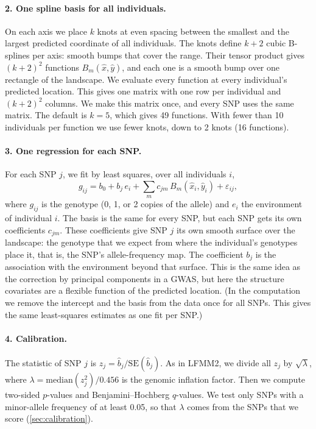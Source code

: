 \paragraph{2. One spline basis for all individuals.}
On each axis we place $k$ knots at even spacing between the smallest and
the largest predicted coordinate of all individuals. The knots define
$k+2$ cubic B-splines per axis: smooth bumps that cover the range. Their
tensor product gives $(k+2)^2$ functions $B_m(\hat{x}, \hat{y})$, and each
one is a smooth bump over one rectangle of the landscape. We evaluate
every function at every individual's predicted location. This gives one
matrix with one row per individual and $(k+2)^2$ columns. We make this
matrix once, and every SNP uses the same matrix. The default is $k = 5$,
which gives 49 functions. With fewer than 10 individuals per function we
use fewer knots, down to 2 knots (16 functions).

\paragraph{3. One regression for each SNP.}
For each SNP $j$, we fit by least squares, over all individuals $i$,
\begin{equation*}
g_{ij} = b_0 + b_j\, e_i + \sum_{m} c_{jm}\, B_m(\hat{x}_i, \hat{y}_i) + \varepsilon_{ij},
\end{equation*}
where $g_{ij}$ is the genotype (0, 1, or 2 copies of the allele) and $e_i$
the environment of individual $i$. The basis is the same for every SNP, but
each SNP gets its own coefficients $c_{jm}$. These coefficients give SNP $j$
its own smooth surface over the landscape: the genotype that we expect from
where the individual's genotypes place it, that is, the SNP's
allele-frequency map. The coefficient $b_j$ is the association with the
environment beyond that surface. This is the same idea as the correction by
principal components in a GWAS, but here the structure covariates are a
flexible function of the predicted location. (In the computation we remove
the intercept and the basis from the data once for all SNPs. This gives the
same least-squares estimates as one fit per SNP.)

\paragraph{4. Calibration.}
The statistic of SNP $j$ is $z_j = \hat{b}_j / \mathrm{SE}(\hat{b}_j)$. As
in LFMM2, we divide all $z_j$ by $\sqrt{\lambda}$, where
$\lambda = \mathrm{median}(z_j^2)/0.456$ is the genomic inflation factor.
Then we compute two-sided $p$-values and Benjamini--Hochberg $q$-values. We
test only SNPs with a minor-allele frequency of at least 0.05, so that
$\lambda$ comes from the SNPs that we score (\cref{sec:calibration}).

